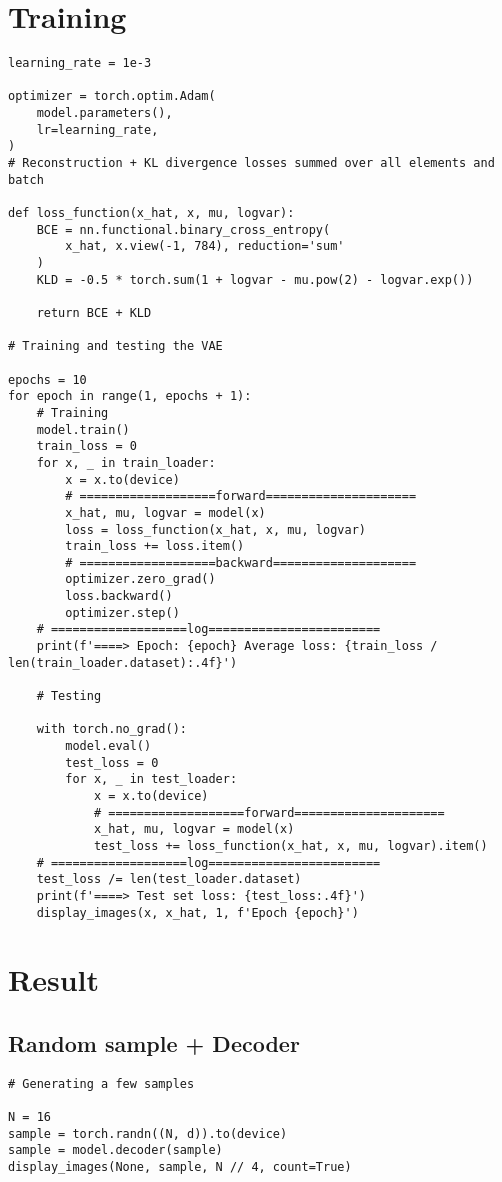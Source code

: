 \section{Training}
\begin{verbatim}
learning_rate = 1e-3

optimizer = torch.optim.Adam(
    model.parameters(),
    lr=learning_rate,
)
# Reconstruction + KL divergence losses summed over all elements and batch

def loss_function(x_hat, x, mu, logvar):
    BCE = nn.functional.binary_cross_entropy(
        x_hat, x.view(-1, 784), reduction='sum'
    )
    KLD = -0.5 * torch.sum(1 + logvar - mu.pow(2) - logvar.exp())

    return BCE + KLD
    
# Training and testing the VAE

epochs = 10
for epoch in range(1, epochs + 1):
    # Training
    model.train()
    train_loss = 0
    for x, _ in train_loader:
        x = x.to(device)
        # ===================forward=====================
        x_hat, mu, logvar = model(x)
        loss = loss_function(x_hat, x, mu, logvar)
        train_loss += loss.item()
        # ===================backward====================
        optimizer.zero_grad()
        loss.backward()
        optimizer.step()
    # ===================log========================
    print(f'====> Epoch: {epoch} Average loss: {train_loss / len(train_loader.dataset):.4f}')
    
    # Testing
    
    with torch.no_grad():
        model.eval()
        test_loss = 0
        for x, _ in test_loader:
            x = x.to(device)
            # ===================forward=====================
            x_hat, mu, logvar = model(x)
            test_loss += loss_function(x_hat, x, mu, logvar).item()
    # ===================log========================
    test_loss /= len(test_loader.dataset)
    print(f'====> Test set loss: {test_loss:.4f}')
    display_images(x, x_hat, 1, f'Epoch {epoch}')
\end{verbatim}

\section{Result}
\subsection{Random sample + Decoder}
\begin{verbatim}
# Generating a few samples

N = 16
sample = torch.randn((N, d)).to(device)
sample = model.decoder(sample)
display_images(None, sample, N // 4, count=True)
\end{verbatim}


